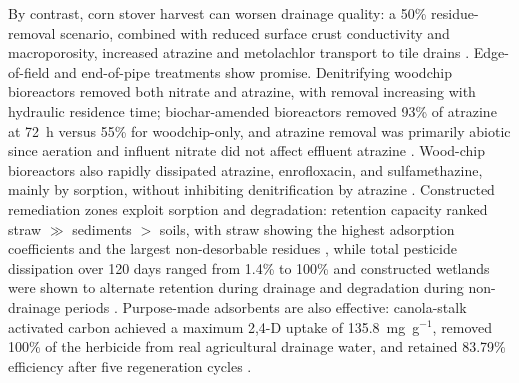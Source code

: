 \documentclass[11pt]{article}
\begin{document}
By contrast, corn stover harvest can worsen drainage quality: a 50\% residue-removal scenario, combined with reduced surface crust conductivity and macroporosity, increased atrazine and metolachlor transport to tile drains \parencite{Shipitalo2016}. Edge-of-field and end-of-pipe treatments show promise. Denitrifying woodchip bioreactors removed both nitrate and atrazine, with removal increasing with hydraulic residence time; biochar-amended bioreactors removed 93\% of atrazine at 72~h versus 55\% for woodchip-only, and atrazine removal was primarily abiotic since aeration and influent nitrate did not affect effluent atrazine \parencite{Hassanpour2019}. Wood-chip bioreactors also rapidly dissipated atrazine, enrofloxacin, and sulfamethazine, mainly by sorption, without inhibiting denitrification by atrazine \parencite{Ilhan2011}. Constructed remediation zones exploit sorption and degradation: retention capacity ranked straw $\gg$ sediments $>$ soils, with straw showing the highest adsorption coefficients and the largest non-desorbable residues \parencite{Vallée2014}, while total pesticide dissipation over 120 days ranged from 1.4\% to 100\% and constructed wetlands were shown to alternate retention during drainage and degradation during non-drainage periods \parencite{Vallée2016}. Purpose-made adsorbents are also effective: canola-stalk activated carbon achieved a maximum 2,4-D uptake of 135.8~mg~g$^{-1}$, removed 100\% of the herbicide from real agricultural drainage water, and retained 83.79\% efficiency after five regeneration cycles \parencite{Amiri2020}.
\end{document}
